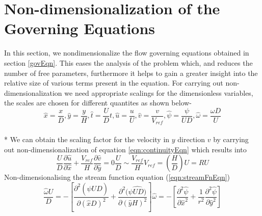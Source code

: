 \documentclass{article}
\begin{document}
\section{Non-dimensionalization of the Governing Equations}
In this section, we nondimensionalize the flow governing equations obtained in section \ref{govEqn}. This eases the analysis of the problem which, and reduces the number of free parameters, furthermore it helps to gain a greater insight into the relative size of various terms present in the equation. For carrying out non-dimensionalization we need appropriate scalings for the dimensionless variables, the scales are chosen for different quantites as shown below-
\begin{equation}
\hat{x}=\frac{x}{D}, \hat{y}=\frac{y}{H},  \hat{t}=\frac{U}{D}t,  \hat{u}=\frac{u}{U},  \hat{v}=\frac{v}{V_{ref}}, \hat{\psi}=\frac{\psi}{UD}, \hat{\omega}=\frac{\omega D}{U}
\end{equation}
\\*
We can obtain the scaling factor for the velocity in $y$ direction $v$ by carrying out non-dimensionalization of equation \ref{eqn:continuityEqn} which results into 
\begin{subequations}
\begin{equation}
\frac{U}{D}\frac{\partial \hat{u}}{\partial \hat{x}} + \frac{V_{ref}}{H}\frac{\partial \hat{v}}{\partial \hat{y}} = 0  
\end{equation}
\begin{equation}
\frac{U}{D}\sim \frac{V_{ref}}{H}  
\end{equation}
\begin{equation}
V_{ref}= \left(\frac{H}{D}\right)U = RU  
\end{equation}
\end{subequations}
Non-dimensionalising the stream function equation (\ref{eqn:streamFnEqn})
\begin{subequations}
\begin{equation}
\frac{\hat{\omega} U}{D} = -\left[\frac{\partial^2 (\hat{\psi}UD)}{\partial (\hat{x}D)^2} +  \frac{\partial^2 (\hat{\psi UD)}}{\partial (\hat{y}H)^2}\right]
\end{equation}
\begin{equation}
\label{eqn:streamFnEqn3}
\hat{\omega} = -\left[\frac{\partial^2 \hat{\psi}}{\partial \hat{x}^2} +  \frac{1}{r^2}\frac{\partial^2 \hat{\psi}}{\partial \hat{y}^2}\right]
\end{equation}
\end{subequations}
\end{document}
